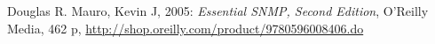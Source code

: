 \begin{thebibliography}{9}

  Douglas R. Mauro, Kevin J, 2005:
  \emph{Essential SNMP, Second Edition},
  O'Reilly Media, 462 p,
  \url{http://shop.oreilly.com/product/9780596008406.do}
  
\end{thebibliography}
